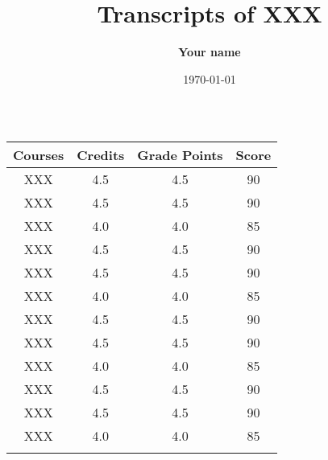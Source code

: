 \documentclass[11pt,a4paper]{article}
\begin{document}
\title{\vspace{-15mm}\fontsize{21pt}{10pt}\selectfont\textbf{Transcripts of XXX}}
\large
\author{\textbf{Your name}}
\date{\today}
\maketitle
\thispagestyle{empty}
\begin{table}[!htbp]
\small
\centering
\begin{tabular}{cccc}
\Xhline{1.5pt}
\textbf{Courses}	&	\textbf{Credits}	&	\textbf{Grade Points} 	&	\textbf{Score}	\\\hline
\hline
XXX	&	4.5 	&	4.5 	&	90	\\\hline
XXX	&	4.5 	&	4.5 	&	90	\\\hline
XXX	&	4.0 	&	4.0 	&	85	\\\hline
XXX	&	4.5 	&	4.5 	&	90	\\\hline
XXX	&	4.5 	&	4.5 	&	90	\\\hline
XXX	&	4.0 	&	4.0 	&	85	\\\hline
XXX	&	4.5 	&	4.5 	&	90	\\\hline
XXX	&	4.5 	&	4.5 	&	90	\\\hline
XXX	&	4.0 	&	4.0 	&	85	\\\hline
XXX	&	4.5 	&	4.5 	&	90	\\\hline
XXX	&	4.5 	&	4.5 	&	90	\\\hline
XXX	&	4.0 	&	4.0 	&	85	\\
\Xhline{1.5pt}
\end{tabular}
\caption*{}
\end{table}
\end{document}
